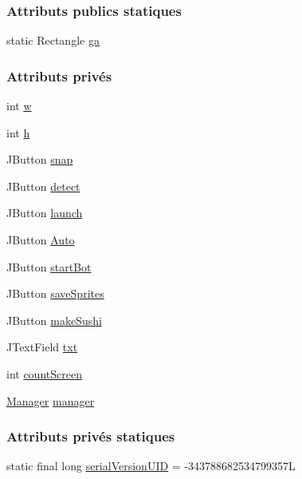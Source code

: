 \subsubsection*{Attributs publics statiques}
\begin{DoxyCompactItemize}
\item 
static Rectangle \hyperlink{classmain_1_1ToolBox_ab1c5162cc4718a5e4b51430dc6ea7d66}{ga}
\end{DoxyCompactItemize}
\subsubsection*{Attributs privés}
\begin{DoxyCompactItemize}
\item 
int \hyperlink{classmain_1_1ToolBox_a2974cabc3f1e5d463de8b96c1a6451fa}{w}
\item 
int \hyperlink{classmain_1_1ToolBox_af21476c3890b8d1ebfa0c30c8e3636ea}{h}
\item 
J\+Button \hyperlink{classmain_1_1ToolBox_ab4249615a8635a1ba3790c3127cc54e4}{snap}
\item 
J\+Button \hyperlink{classmain_1_1ToolBox_a62c86c165a3c33ca19837acd93844548}{detect}
\item 
J\+Button \hyperlink{classmain_1_1ToolBox_a7f10ce96929414e4aaf86dbdf772c572}{launch}
\item 
J\+Button \hyperlink{classmain_1_1ToolBox_aff3388ed81261e9356b00ef3be215059}{Auto}
\item 
J\+Button \hyperlink{classmain_1_1ToolBox_a248a61ebb2d33e7ac7f7929345d65d93}{start\+Bot}
\item 
J\+Button \hyperlink{classmain_1_1ToolBox_a009d9ace3584b9153963e345708fe718}{save\+Sprites}
\item 
J\+Button \hyperlink{classmain_1_1ToolBox_a1ab2e723f8e1f783109242ccc1b811c1}{make\+Sushi}
\item 
J\+Text\+Field \hyperlink{classmain_1_1ToolBox_a70a0516fb7bc406c12be2414b5bbb569}{txt}
\item 
int \hyperlink{classmain_1_1ToolBox_ac5a98d24c95323e970d1ffdc52f3ce9c}{count\+Screen}
\item 
\hyperlink{classmain_1_1Manager}{Manager} \hyperlink{classmain_1_1ToolBox_a10d9cda5ab25a1fccd170b68d0a41e2f}{manager}
\end{DoxyCompactItemize}
\subsubsection*{Attributs privés statiques}
\begin{DoxyCompactItemize}
\item 
static final long \hyperlink{classmain_1_1ToolBox_aa817e24365a3bf91a4ef5d99b45d44f2}{serial\+Version\+U\+I\+D} = -\/343788682534799357\+L
\end{DoxyCompactItemize}


